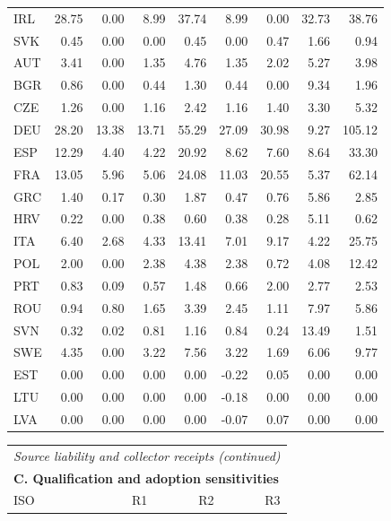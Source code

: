 {\begin{longtable}{@{}lrrrrrrrr@{}}
IRL & 28.75 &  0.00 &  8.99 & 37.74 &  8.99 &  0.00 &  32.73 &  38.76 \\
SVK &  0.45 &  0.00 &  0.00 &  0.45 &  0.00 &  0.47 &   1.66 &   0.94 \\
AUT &  3.41 &  0.00 &  1.35 &  4.76 &  1.35 &  2.02 &   5.27 &   3.98 \\
BGR &  0.86 &  0.00 &  0.44 &  1.30 &  0.44 &  0.00 &   9.34 &   1.96 \\
CZE &  1.26 &  0.00 &  1.16 &  2.42 &  1.16 &  1.40 &   3.30 &   5.32 \\
DEU & 28.20 & 13.38 & 13.71 & 55.29 & 27.09 & 30.98 &   9.27 & 105.12 \\
ESP & 12.29 &  4.40 &  4.22 & 20.92 &  8.62 &  7.60 &   8.64 &  33.30 \\
FRA & 13.05 &  5.96 &  5.06 & 24.08 & 11.03 & 20.55 &   5.37 &  62.14 \\
GRC &  1.40 &  0.17 &  0.30 &  1.87 &  0.47 &  0.76 &   5.86 &   2.85 \\
HRV &  0.22 &  0.00 &  0.38 &  0.60 &  0.38 &  0.28 &   5.11 &   0.62 \\
ITA &  6.40 &  2.68 &  4.33 & 13.41 &  7.01 &  9.17 &   4.22 &  25.75 \\
POL &  2.00 &  0.00 &  2.38 &  4.38 &  2.38 &  0.72 &   4.08 &  12.42 \\
PRT &  0.83 &  0.09 &  0.57 &  1.48 &  0.66 &  2.00 &   2.77 &   2.53 \\
ROU &  0.94 &  0.80 &  1.65 &  3.39 &  2.45 &  1.11 &   7.97 &   5.86 \\
SVN &  0.32 &  0.02 &  0.81 &  1.16 &  0.84 &  0.24 &  13.49 &   1.51 \\
SWE &  4.35 &  0.00 &  3.22 &  7.56 &  3.22 &  1.69 &   6.06 &   9.77 \\
EST &  0.00 &  0.00 &  0.00 &  0.00 & -0.22 &  0.05 &   0.00 &   0.00 \\
LTU &  0.00 &  0.00 &  0.00 &  0.00 & -0.18 &  0.00 &   0.00 &   0.00 \\
LVA &  0.00 &  0.00 &  0.00 &  0.00 & -0.07 &  0.07 &   0.00 &   0.00 \\
\end{longtable}
\addtocounter{table}{-1}
\begin{longtable}{@{}lrrr@{}}
\multicolumn{4}{l}{\textit{Source liability and collector receipts (continued)}} \\
\multicolumn{4}{l}{\textbf{C. Qualification and adoption sensitivities}} \\
\toprule
ISO & R1 & R2 & R3 \\

\end{longtable}}
